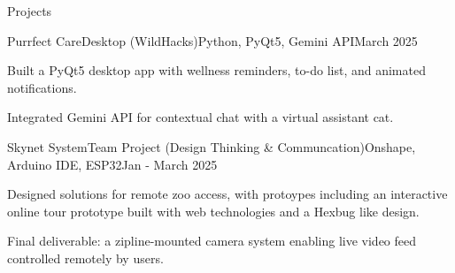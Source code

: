 \documentclass[
    a4paper,
    9pt,
]{resume}
\begin{document}
\begin{rSection}{Projects}

	\begin{rSubsection}{Purrfect Care}{Desktop (WildHacks)}{Python, PyQt5, Gemini API}{March 2025}{}
		\item Built a PyQt5 desktop app with wellness reminders, to-do list, and animated notifications.
  		\item Integrated Gemini API for contextual chat with a virtual assistant cat.
	  \end{rSubsection}



\begin{rSubsection}{Skynet System}{Team Project (Design Thinking \& Communcation)}{Onshape, Arduino IDE, ESP32}{Jan - March 2025}
	  \item Designed solutions for remote zoo access, with protoypes including an interactive online tour prototype built with web technologies and a Hexbug like design.
  	\item Final deliverable: a zipline-mounted camera system enabling live video feed controlled remotely by users.
    \end{rSubsection}
    
  \end{rSection}

%



\end{document}
